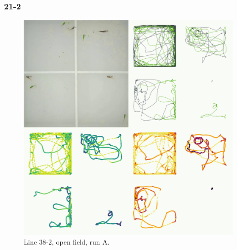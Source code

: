 \documentclass[
]{book}
\begin{document}
\hypertarget{section-5}{%
\subsubsection{21-2}\label{section-5}}



\begin{figure}
\includegraphics[width=1\linewidth]{figs/mikk_behaviour/four_panel_plots/open_field_20191113_1527_21-2_L_A_300} \caption{Line 38-2, open field, run A.}\label{fig:4p-21-2-of-A}
\end{figure}
\end{document}
